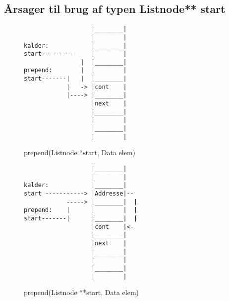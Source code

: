 \documentclass[10pt,a4paper,danish]{article}
\begin{document}
\subsection{Årsager til brug af typen Listnode** start}

\begin{figure}[tb!]
  \centering
  \begin{center}
\begin{verbatim}
                   |________|
                   |        |
kalder:            |________|
start --------     |        |
                |  |________|
prepend:        |  |        |
start-------|   |  |________|
            |   -> |cont    |
            |----> |________|
                   |next    |
                   |________|
                   |        |
                   |________|
                   |        |
\end{verbatim}
  \end{center}
  \caption{prepend(Listnode *start, Data elem)}
  \label{fig:prependstar}
\end{figure}

\begin{figure}[htb!]
  \centering
  \begin{center}
\begin{verbatim}
                   |________|
                   |        |
kalder:            |________|
start -----------> |Addresse|--
            -----> |________|  |
prepend:    |      |        |  |
start-------|      |________|  |
                   |cont    |<-
                   |________|
                   |next    |
                   |________|
                   |        |
                   |________|
                   |        |
\end{verbatim}
  \end{center}
  \caption{prepend(Listnode **start, Data elem)}
  \label{fig:prependstarstar}
\end{figure}
\end{document}
